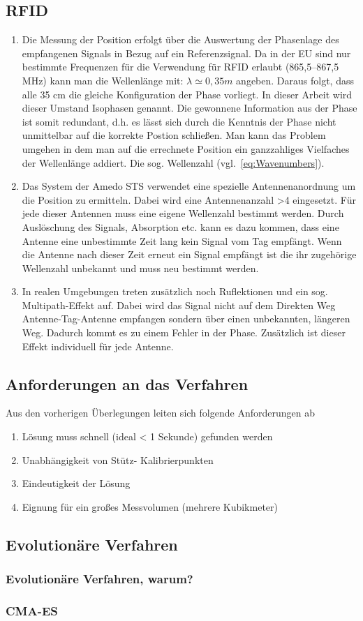 \subsection{RFID}
\label{sec:Measurement1}
\begin{enumerate}
	\item Die Messung der Position erfolgt über die Auswertung der Phasenlage des empfangenen Signals in Bezug auf ein Referenzsignal. Da in der EU sind nur bestimmte Frequenzen für die Verwendung für RFID erlaubt (865,5–867,5 MHz) kann man die Wellenlänge mit: $ \lambda\simeq0,35 m $ angeben. Daraus folgt, dass alle 35 cm die gleiche Konfiguration der Phase vorliegt. In dieser Arbeit wird dieser Umstand Isophasen genannt. Die gewonnene Information aus der Phase ist somit redundant, d.h. es lässt sich durch die Kenntnis der Phase nicht unmittelbar auf die korrekte Postion schließen. Man kann das Problem umgehen in dem man auf die errechnete Position ein ganzzahliges Vielfaches der Wellenlänge addiert. Die sog. Wellenzahl (vgl.~\eqref{eq:Wavenumbers}).
	\item Das System der Amedo STS verwendet eine spezielle Antennenanordnung um die Position zu ermitteln. Dabei wird eine Antennenanzahl >4 eingesetzt. Für jede dieser Antennen muss eine eigene Wellenzahl bestimmt werden. Durch Auslöschung des Signals, Absorption etc. kann es dazu kommen, dass eine Antenne eine unbestimmte Zeit lang kein Signal vom Tag empfängt. Wenn die Antenne nach dieser Zeit erneut ein Signal empfängt ist die ihr zugehörige Wellenzahl unbekannt und muss neu bestimmt werden. 
	\item In realen Umgebungen treten zusätzlich noch Ruflektionen und ein sog. Multipath-Effekt auf. Dabei wird das Signal nicht auf dem Direkten Weg Antenne-Tag-Antenne empfangen sondern über einen unbekannten, längeren Weg. Dadurch kommt es zu einem Fehler in der Phase. Zusätzlich ist dieser Effekt individuell für jede Antenne.
\end{enumerate}
\lipsum[1-2]

\subsection{Anforderungen an das Verfahren}
Aus den vorherigen Überlegungen leiten sich folgende Anforderungen ab
\begin{enumerate}
\item Lösung muss schnell (ideal < 1 Sekunde) gefunden werden
\item Unabhängigkeit von Stütz- Kalibrierpunkten
\item Eindeutigkeit der Lösung
\item Eignung für ein großes Messvolumen (mehrere Kubikmeter)

\end{enumerate}

\subsection{Evolutionäre Verfahren}
\lipsum[1-2]

\subsubsection{Evolutionäre Verfahren, warum?}
\lipsum[1]

\subsubsection{CMA-ES}
\lipsum[1]